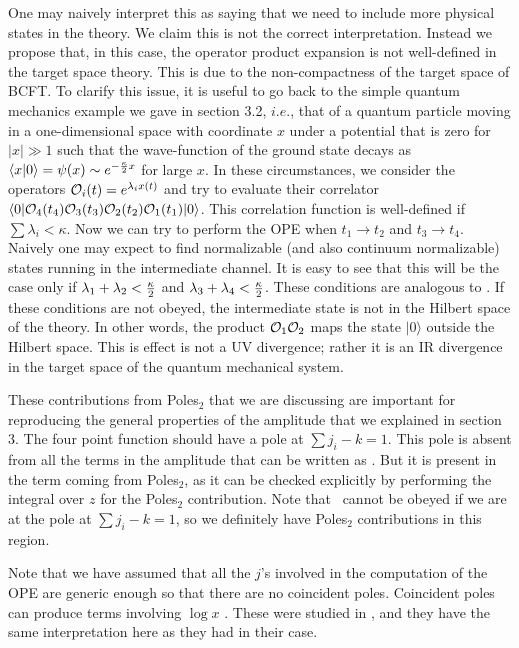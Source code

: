 One may naively interpret this as saying
 that we need to include more physical states
in the theory. We claim this is not the correct interpretation.
Instead we propose that, in this case, the operator product
expansion is not
well-defined in the target space theory. This is due to the non-compactness
of the target space of BCFT. To clarify this issue, it is useful
to go back to the simple quantum mechanics example we gave in
section 3.2,
$i.e.$, that of a quantum particle moving in a one-dimensional
space with coordinate $x$ under
a potential that is zero for $|x|\gg 1$
such that the wave-function of the ground state
decays as $\langle x |0\rangle =
\psi(x) \sim e^{-{\kappa \over 2} x}$
 for large $x$. In these circumstances, we
consider the operators $ {\cal O}_i(t) =  e^{\lambda_i x(t)}$
and try to evaluate their
 correlator $\langle 0|{\cal O}_4(t_4){\cal O}_3(t_3)
 {\cal O}_2(t_2){\cal O}_1(t_1)
|0\rangle $. This correlation function is well-defined if
$\sum \lambda_i < \kappa$. Now we can try to perform the OPE when
$t_1 \to t_2$ and $t_3 \to t_4$.
Naively one may expect to find normalizable (and also
continuum normalizable) states running in the intermediate channel.
It is easy to see
that this will be the case only if $\lambda_1 + \lambda_2
<{\kappa  \over 2}$
 and $\lambda_3 + \lambda_4 <{\kappa \over 2} $.
 These conditions are analogous
to \physcond . If these conditions are not obeyed, the intermediate
state is not in the Hilbert space of the theory. In other words,
the product ${\cal O}_1 {\cal O}_2$ maps the state $|0\rangle$
outside the Hilbert space. This is effect is not a UV divergence;
rather it is
an IR divergence in the target space of the quantum mechanical
system.



These contributions from Poles$_2$ that we are discussing are important
for reproducing the general properties of the amplitude that we explained
in section 3. The four point function should  have a pole at
$\sum j_i - k =1$. This pole is absent from all the terms in the amplitude
that can be written as \formofc . But it is present in the term coming
from Poles$_2$, as it can be checked explicitly by performing the integral
over $z$ for the Poles$_2$ contribution. Note that
 \physcond\ cannot be obeyed
if we are at the pole at $\sum j_i - k =1$, so we definitely have
Poles$_2$ contributions in this region.


Note that we have assumed that all the $j$'s involved in the
computation of the OPE are generic enough so that there are
no coincident poles. Coincident poles can produce terms involving
$\log x$ . These were studied in , and they have
the same interpretation here as they had in their case.




